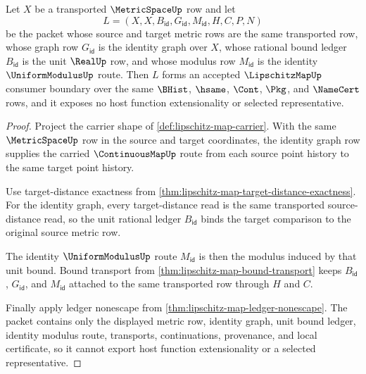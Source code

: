 \begin{theorem}
\label{thm:lipschitz-map-identity-carrier-boundary}
Let $X$ be a transported $\MetricSpaceUp$ row and let
$$
L=(X,X,B_{\mathsf{id}},G_{\mathsf{id}},M_{\mathsf{id}},H,C,P,N)
$$
be the packet whose source and target metric rows are the same transported row, whose graph row $G_{\mathsf{id}}$ is the identity graph over $X$, whose rational bound ledger $B_{\mathsf{id}}$ is the unit $\RealUp$ row, and whose modulus row $M_{\mathsf{id}}$ is the identity $\UniformModulusUp$ route. Then $L$ forms an accepted $\LipschitzMapUp$ consumer boundary over the same $\BHist$, $\hsame$, $\Cont$, $\Pkg$, and $\NameCert$ rows, and it exposes no host function extensionality or selected representative.
\end{theorem}
\begin{proof}
Project the carrier shape of \autoref{def:lipschitz-map-carrier}. With the same $\MetricSpaceUp$ row in the source and target coordinates, the identity graph row supplies the carried $\ContinuousMapUp$ route from each source point history to the same target point history.

Use target-distance exactness from \autoref{thm:lipschitz-map-target-distance-exactness}. For the identity graph, every target-distance read is the same transported source-distance read, so the unit rational ledger $B_{\mathsf{id}}$ binds the target comparison to the original source metric row.

The identity $\UniformModulusUp$ route $M_{\mathsf{id}}$ is then the modulus induced by that unit bound. Bound transport from \autoref{thm:lipschitz-map-bound-transport} keeps $B_{\mathsf{id}}$, $G_{\mathsf{id}}$, and $M_{\mathsf{id}}$ attached to the same transported row through $H$ and $C$.

Finally apply ledger nonescape from \autoref{thm:lipschitz-map-ledger-nonescape}. The packet contains only the displayed metric row, identity graph, unit bound ledger, identity modulus route, transports, continuations, provenance, and local certificate, so it cannot export host function extensionality or a selected representative.
\end{proof}

